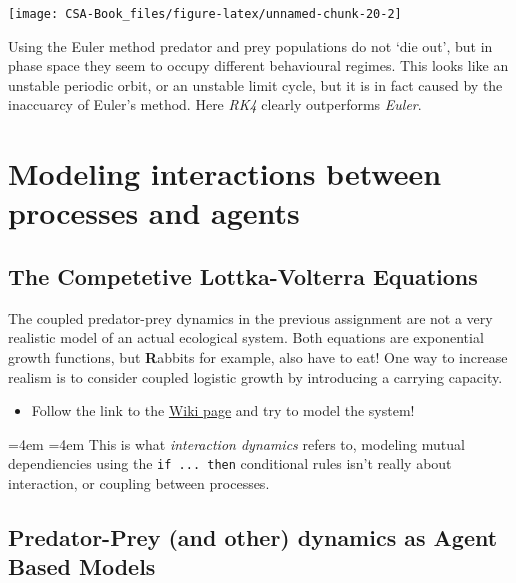 \documentclass[12pt,]{book}
\providecommand{\tightlist}{%
  \setlength{\itemsep}{0pt}\setlength{\parskip}{0pt}}
\renewenvironment{quote}{%
  \par \small \medskip \block
  \leftskip=4em \rightskip=4em%
  \noindent \ignorespaces}{%
  \par \medskip
  }
\let\stdsection\section
\renewcommand\section{\newpage\stdsection}
\begin{document}
\begin{center}\texttt{[image: CSA-Book\_files/figure-latex/unnamed-chunk-20-2]} \end{center}

Using the Euler method predator and prey populations do not `die out', but in phase space they seem to occupy different behavioural regimes. This looks like an unstable periodic orbit, or an unstable limit cycle, but it is in fact caused by the inaccuarcy of Euler's method. Here \emph{RK4} clearly outperforms \emph{Euler}.

\hypertarget{advmodels}{%
\section{\texorpdfstring{\textbf{Modeling interactions between processes and agents}}{Modeling interactions between processes and agents}}\label{advmodels}}

\hypertarget{the-competetive-lottka-volterra-equations}{%
\subsection{The Competetive Lottka-Volterra Equations}\label{the-competetive-lottka-volterra-equations}}

The coupled predator-prey dynamics in the previous assignment are not a very realistic model of an actual ecological system. Both equations are exponential growth functions, but \textbf{R}abbits for example, also have to eat! One way to increase realism is to consider coupled logistic growth by introducing a carrying capacity.

\begin{itemize}
\tightlist
\item
  Follow the link to the \href{https://en.wikipedia.org/wiki/Competitive_Lotka???Volterra_equations}{Wiki page} and try to model the system!
\end{itemize}

\begin{quote}
This is what \emph{interaction dynamics} refers to, modeling mutual dependiencies using the \texttt{if\ ...\ then} conditional rules isn't really about interaction, or coupling between processes.
\end{quote}

\hypertarget{predator-prey-and-other-dynamics-as-agent-based-models}{%
\subsection{Predator-Prey (and other) dynamics as Agent Based Models}\label{predator-prey-and-other-dynamics-as-agent-based-models}}
\end{document}
